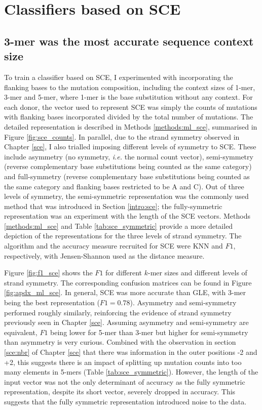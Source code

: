 

\section{Classifiers based on SCE}\label{ml:sce}

\subsection{3-mer was the most accurate sequence context size}
To train a classifier based on SCE, I experimented with incorporating the flanking bases to the mutation composition, including the context sizes of 1-mer, 3-mer and 5-mer, where 1-mer is the base substitution without any context. For each donor, the vector used to represent SCE was simply the counts of mutations with flanking bases incorporated divided by the total number of mutations. The detailed representation is described in Methods \ref{methods:ml_sce}, summarised in Figure \ref{fig:sce_counts}. In parallel, due to the strand symmetry observed in Chapter \ref{sce}, I also trialled imposing different levels of symmetry to SCE. These include asymmetry (no symmetry, \textit{i.e.} the normal count vector), semi-symmetry (reverse complementary base substitutions being counted as the same category) and full-symmetry (reverse complementary base substitutions being counted as the same category and flanking bases restricted to be A and C). Out of three levels of symmetry, the semi-symmetric representation was the commonly used method that was introduced in Section \ref{intro:sce}; the fully-symmetric representation was an experiment with the length of the SCE vectors. Methods \ref{methods:ml_sce} and Table \ref{tab:sce_symmetric} provide a more detailed depiction of the representations for the three levels of strand symmetry. The algorithm and the accuracy measure recruited for SCE were KNN and $F1$, respectively, with Jensen-Shannon used as the distance measure. 

Figure \ref{fig:f1_sce} shows the $F1$ for different $k$-mer sizes and different levels of strand symmetry. The corresponding confusion matrices can be found in Figure \ref{fig:apdx_ml_sce}. In general, SCE was more accurate than GLE, with 3-mer being the best representation ($F1=0.78$). Asymmetry and semi-symmetry performed roughly similarly, reinforcing the evidence of strand symmetry previously seen in Chapter \ref{sce}. Assuming asymmetry and semi-symmetry are equivalent, $F1$ being lower for 5-mer than 3-mer but higher for semi-symmetry than asymmetry is very curious. Combined with the observation in section \ref{sce:nbr} of Chapter \ref{sce} that there was information in the outer positions -2 and +2, this suggests there is an impact of splitting up mutation counts into too many elements in 5-mers (Table \ref{tab:sce_symmetric}). However, the length of the input vector was not the only determinant of accuracy as the fully symmetric representation, despite its short vector, severely dropped in accuracy. This suggests that the fully symmetric representation introduced noise to the data.

